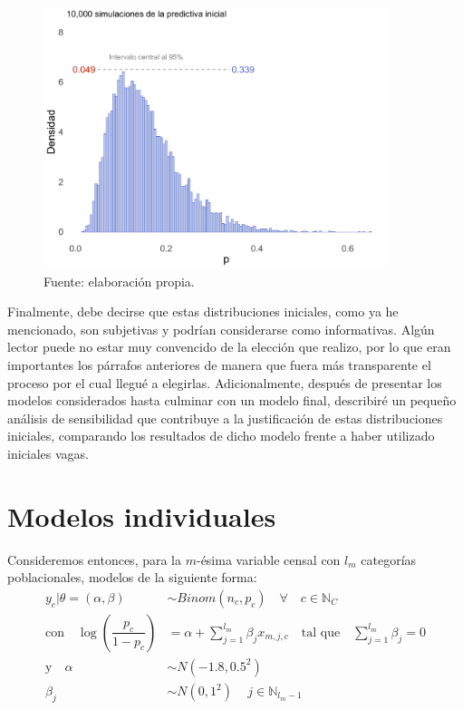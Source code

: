 \begin{figure}[h]
	\centering
	\includegraphics[width = 0.9\textwidth]{Figs/Modelado/Pred_Inicial}
	\caption{Fuente: elaboración propia.}
	\label{fig:Predictiva_Inicial}
\end{figure}

Finalmente, debe decirse que estas distribuciones iniciales, como ya he mencionado, son subjetivas y podrían considerarse como informativas. Algún lector puede no estar muy convencido de la elección que realizo, por lo que eran importantes los párrafos anteriores de manera que fuera más transparente el proceso por el cual llegué a elegirlas. Adicionalmente, después de presentar los modelos considerados hasta culminar con un modelo final, describiré un pequeño análisis de sensibilidad que contribuye a la justificación de estas distribuciones iniciales, comparando los resultados de dicho modelo frente a haber utilizado iniciales vagas.  

\section{Modelos individuales}

Consideremos entonces, para la $m$-ésima variable censal con $l_m$ categorías poblacionales, modelos de la siguiente forma:
\begin{align}\label{eq:Modelo_Nal_Ind}
y_c|\theta=(\alpha,\beta) & \sim Binom(n_c,p_c) \quad \forall \quad c \in \mathbb{N}_C \nonumber \\
\text{con} \quad \log\left(\dfrac{p_c}{1-p_c}\right) &= \alpha + \sum\limits_{j=1}^{l_m} \beta_j x_{m,j,c} \quad \text{tal que} \quad \sum\limits_{j = 1}^{l_m} \beta_j = 0 \nonumber \\
\text{y} \quad \alpha & \sim N(-1.8,0.5^2) \nonumber \\
\beta_j & \sim N(0,1^2) \quad \, j \in \mathbb{N}_{l_m-1} 
\end{align}

